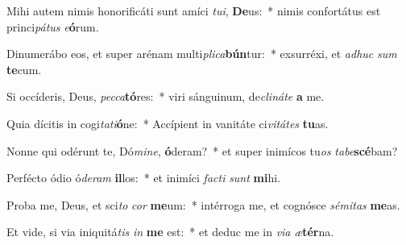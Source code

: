\item Mihi autem nimis honorificáti sunt amíci \textit{tu}\textit{i}, \textbf{De}us:~* nimis confortátus est princi\textit{pá}\textit{tus} \textit{e}\textbf{ó}rum.
\item Dinumerábo eos, et super arénam multi\textit{pli}\textit{ca}\textbf{bún}tur:~* exsurréxi, et \textit{ad}\textit{huc} \textit{sum} \textbf{te}cum.
\item Si occíderis, Deus, \textit{pec}\textit{ca}\textbf{tó}res:~* viri sánguinum, de\textit{cli}\textit{ná}\textit{te} \textbf{a} me.
\item Quia dícitis in cogi\textit{ta}\textit{ti}\textbf{ó}ne:~* Accípient in vanitáte ci\textit{vi}\textit{tá}\textit{tes} \textbf{tu}as.
\item Nonne qui odérunt te, Dó\textit{mi}\textit{ne}, \textbf{ó}deram?~* et super inimícos tu\textit{os} \textit{ta}\textit{be}\textbf{scé}bam?
\item Perfécto ódio ó\textit{de}\textit{ram} \textbf{il}los:~* et inimíci \textit{fac}\textit{ti} \textit{sunt} \textbf{mi}hi.
\item Proba me, Deus, et sci\textit{to} \textit{cor} \textbf{me}um:~* intérroga me, et cognósce \textit{sé}\textit{mi}\textit{tas} \textbf{me}as.
\item Et vide, si via iniquitá\textit{tis} \textit{in} \textbf{me} est:~* et deduc me in \textit{vi}\textit{a} \textit{æ}\textbf{tér}na.
